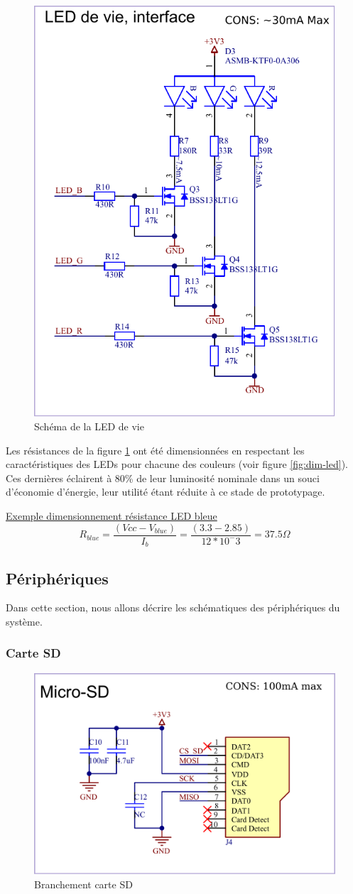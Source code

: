 \begin{figure}[h]
	\centering
	\includegraphics[width=0.4\linewidth]{../figures/etude/sch/LED-Vie}
	\caption{Schéma de la LED de vie}
	\label{fig:led-vie}
\end{figure}

Les résistances de la figure \ref{fig:led-vie} ont été dimensionnées en respectant les caractéristiques des LEDs pour chacune des couleurs (voir figure \ref{fig:dim-led}). Ces dernières éclairent à 80\% de leur luminosité nominale dans un souci d'économie d'énergie, leur utilité étant réduite à ce stade de prototypage.

\begin{center}
	\underline{Exemple dimensionnement résistance LED bleue}
	\begin{equation*}
		R_{blue} = \frac{(Vcc - V_{blue})}{I_b} = \frac{(3.3 - 2.85)}{12*10^-3} = 37.5 \Omega
	\end{equation*}
\end{center}

\clearpage

\subsection{Périphériques} \label{ssec:Dev-Devices}
Dans cette section, nous allons décrire les schématiques des périphériques du système.
 
\subsubsection{Carte SD}

\begin{figure}[h]
	\centering
	\includegraphics[width=0.5\linewidth]{../figures/etude/sch/Carte-SD}
	\caption{Branchement carte SD}
	\label{fig:carte-sd}
\end{figure}

